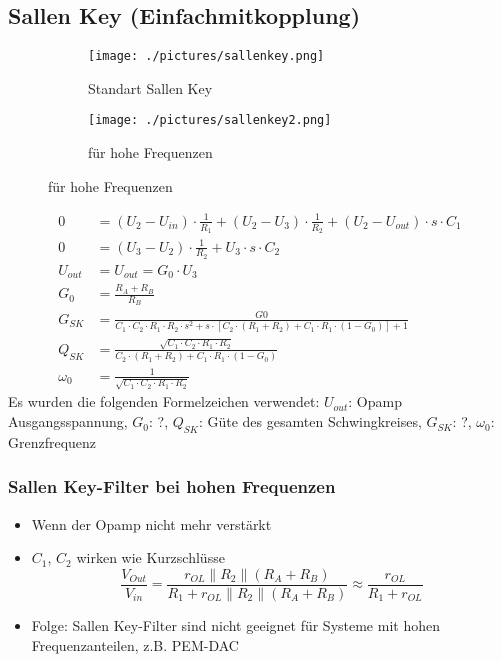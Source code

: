 \subsection{Sallen Key (Einfachmitkopplung)}
\begin{figure}[ht]
	\centering
	\begin{subfigure}[b]{0.4\textwidth}
		\centering
		\texttt{[image: ./pictures/sallenkey.png]}
		\caption{Standart Sallen Key}
	\end{subfigure}
	\qquad\qquad
	\begin{subfigure}[b]{0.4\textwidth}
		\centering
		\texttt{[image: ./pictures/sallenkey2.png]}
		\caption{für hohe Frequenzen}
	\end{subfigure}
\end{figure}
\begin{align*}
	0		&= (U_2-U_{in})\cdot \frac{1}{R_1}+(U_2-U_3)\cdot \frac{1}{R_2}+(U_2-U_{out})\cdot s\cdot C_1 \\
	0		&= (U_3-U_2)\cdot \frac{1}{R_2}+U_3\cdot s\cdot C_2\\
	U_{out}	&= U_{out}=G_0\cdot U_3 \\
	G_0		&= \frac{R_{A}+R_{B}}{R_{B}}\\
	G_{SK}	&= \frac{G0}{C_1\cdot C_2\cdot R_1\cdot R_2\cdot s^2+s\cdot [C_2\cdot (R_1+R_2)+C_1\cdot R_1\cdot (1-G_0)]+1}\\
	Q_{SK}	&= \frac{\sqrt{C_1\cdot C_2\cdot R_1\cdot R_2}}{C_2\cdot (R_1+R_2)+C_1\cdot R_1\cdot (1-G_0)}\\
	\omega_0 &= \frac{1}{\sqrt{C_1\cdot C_2\cdot R_1\cdot R_2}}
\end{align*}
Es wurden die folgenden Formelzeichen verwendet: $U_{out}$: Opamp Ausgangsspannung, $G_0$: ?, $Q_{SK}$: Güte des gesamten Schwingkreises, $G_{SK}$: ?,
$\omega_0$: Grenzfrequenz

\subsubsection{Sallen Key-Filter bei hohen Frequenzen}
\begin{itemize}
  \item Wenn der Opamp nicht mehr verstärkt
  \item $C_1$, $C_2$ wirken wie Kurzschlüsse
  \begin{equation*}
  \frac{V_{Out}}{V_{in}}=\frac{r_{OL}\parallel R_2\parallel
  (R_{A}+R_{B})}{R_1+r_{OL}\parallel R_2\parallel (R_{A}+R_{B})}\approx
  \frac{r_{OL}}{R_1+r_{OL}}
  \end{equation*}
  \item Folge: Sallen Key-Filter sind nicht geeignet für Systeme mit hohen
  Frequenzanteilen, z.B. PEM-DAC
\end{itemize}


